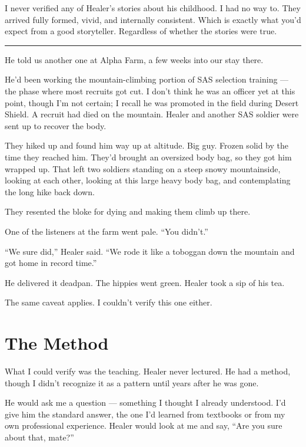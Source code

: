 I never verified any of Healer's stories about his childhood. I had no way to. They arrived fully formed, vivid, and internally consistent. Which is exactly what you'd expect from a good storyteller. Regardless of whether the stories were true.

\vspace{1cm}\noindent\rule{0.5\textwidth}{0.5pt}\vspace{0.5cm}

He told us another one at Alpha Farm, a few weeks into our stay there.

He'd been working the mountain-climbing portion of SAS selection training --- the phase where most recruits got cut. I don't think he was an officer yet at this point, though I'm not certain; I recall he was promoted in the field during Desert Shield. A recruit had died on the mountain. Healer and another SAS soldier were sent up to recover the body.

They hiked up and found him way up at altitude. Big guy. Frozen solid by the time they reached him. They'd brought an oversized body bag, so they got him wrapped up. That left two soldiers standing on a steep snowy mountainside, looking at each other, looking at this large heavy body bag, and contemplating the long hike back down.

They resented the bloke for dying and making them climb up there.

One of the listeners at the farm went pale. ``You didn't.''

``We sure did,'' Healer said. ``We rode it like a toboggan down the mountain and got home in record time.''

He delivered it deadpan. The hippies went green. Healer took a sip of his tea.

The same caveat applies. I couldn't verify this one either.

\section*{The Method}
\label{record:hs-the-method}

What I could verify was the teaching. Healer never lectured. He had a method, though I didn't recognize it as a pattern until years after he was gone.

He would ask me a question --- something I thought I already understood. I'd give him the standard answer, the one I'd learned from textbooks or from my own professional experience. Healer would look at me and say, ``Are you sure about that, mate?''


